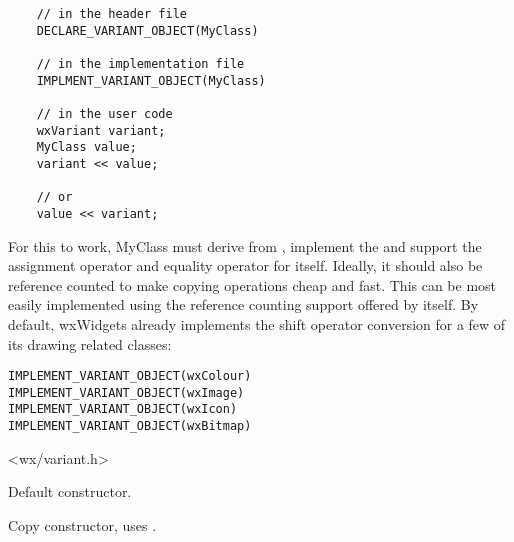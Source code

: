 \begin{verbatim}
    // in the header file
    DECLARE_VARIANT_OBJECT(MyClass)
    
    // in the implementation file
    IMPLMENT_VARIANT_OBJECT(MyClass)
    
    // in the user code
    wxVariant variant;
    MyClass value;
    variant << value;
    
    // or
    value << variant;
\end{verbatim}

For this to work, MyClass must derive from , implement
the 
and support the assignment operator and equality operator for itself. Ideally, it
should also be reference counted to make copying operations cheap and fast. This
can be most easily implemented using the reference counting support offered by
 itself. By default, wxWidgets already implements
the shift operator conversion for a few of its drawing related classes:

\begin{verbatim}
IMPLEMENT_VARIANT_OBJECT(wxColour)
IMPLEMENT_VARIANT_OBJECT(wxImage)
IMPLEMENT_VARIANT_OBJECT(wxIcon)
IMPLEMENT_VARIANT_OBJECT(wxBitmap)
\end{verbatim}




<wx/variant.h>






\label{wxvariantctor}


Default constructor.


Copy constructor, uses .



